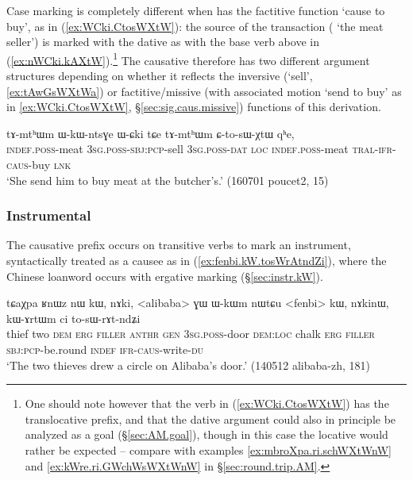 Case marking is completely different when  has the factitive function `cause to buy', as in (\ref{ex:WCki.CtosWXtW}): the source of the transaction ( `the meat seller') is marked with the dative as with the base verb above in (\ref{ex:nWCki.kAXtW}).\footnote{One should note however that the verb in (\ref{ex:WCki.CtosWXtW}) has the translocative prefix, and that the dative argument could also in principle be analyzed as a goal (§\ref{sec:AM.goal}), though in this case the locative  would rather be expected -- compare with examples \ref{ex:mbroXpa.ri.schWXtWnW}  and \ref{ex:kWre.ri.GWchWsWXtWnW} in §\ref{sec:round.trip.AM}.} The causative   therefore has two different argument structures depending on whether it reflects the inversive (`sell', \ref{ex:tAwGsWXtWa}) or factitive/missive (with associated motion `send to buy' as in \ref{ex:WCki.CtosWXtW}, §\ref{sec:sig.caus.missive}) functions of this derivation.

\begin{exe}
\ex \label{ex:WCki.CtosWXtW}
\gll tɤ-mtʰɯm ɯ-kɯ-ntsɣe ɯ-ɕki tɕe tɤ-mtʰɯm ɕ-to-sɯ-χtɯ qʰe, \\
\textsc{indef}.\textsc{poss}-meat \textsc{3sg}.\textsc{poss}-\textsc{sbj}:\textsc{pcp}-sell \textsc{3sg}.\textsc{poss}-\textsc{dat} \textsc{loc} \textsc{indef}.\textsc{poss}-meat \textsc{tral}-\textsc{ifr}-\textsc{caus}-buy \textsc{lnk} \\
\glt `She send him to buy meat at the butcher's.' (160701 poucet2, 15)
\end{exe}

\subsubsection{Instrumental} \label{sec:sig.caus.instrumental}
The causative prefix occurs on transitive verbs to mark an instrument, syntactically treated as a causee as in (\ref{ex:fenbi.kW.tosWrAtndZi}), where the Chinese loanword  occurs with ergative marking (§\ref{sec:instr.kW}). 

\begin{exe}
\ex \label{ex:fenbi.kW.tosWrAtndZi}
\gll tɕaχpa ʁnɯz nɯ kɯ, nɤki, <alibaba> ɣɯ ɯ-kɯm nɯtɕu <fenbi> kɯ, nɤkinɯ, kɯ-ɤrtɯm ci to-sɯ-rɤt-ndʑi \\
thief two \textsc{dem} \textsc{erg} \textsc{filler}  \textsc{anthr} \textsc{gen} \textsc{3sg}.\textsc{poss}-door \textsc{dem}:\textsc{loc} chalk \textsc{erg} \textsc{filler} \textsc{sbj}:\textsc{pcp}-be.round \textsc{indef} \textsc{ifr}-\textsc{caus}-write-\textsc{du} \\
\glt `The two thieves drew a circle on Alibaba's door.' (140512 alibaba-zh, 181)
\end{exe}

